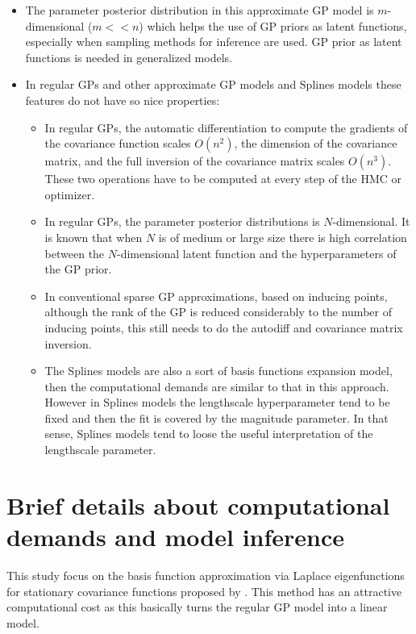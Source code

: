 \documentclass[onecolumn,a4paper,11pt]{article}
\begin{document}
\begin{itemize}
	\item The parameter posterior distribution in this approximate GP model is $m$-dimensional ($m<<n$) which helps the use of GP priors as latent functions, especially when sampling methods for inference are used. GP prior as latent functions is needed in generalized models.

	\item In regular GPs and other approximate GP models and Splines models these features do not have so nice properties:
	\begin{itemize}
		\item In regular GPs, the automatic differentiation to compute the gradients of the covariance function scales $O(n^2)$, the dimension of the covariance matrix, and the full inversion of the covariance matrix scales $O(n^3)$. These two operations have to be computed at every step of the HMC or optimizer.

		\item In regular GPs, the parameter posterior distributions is $N$-dimensional. It is known that when $N$ is of medium or large size there is high correlation between the $N$-dimensional latent function and the hyperparameters of the GP prior.

		\item In conventional sparse GP approximations, based on inducing points, although the rank of the GP is reduced considerably to the number of inducing points, this still needs to do the autodiff and covariance matrix inversion.

		\item The Splines models are also a sort of basis functions expansion model, then the computational demands are similar to that in this approach. However in Splines models the lengthscale hyperparameter tend to be fixed and then the fit is covered by the magnitude parameter. In that sense, Splines models tend to loose the useful interpretation of the lengthscale parameter.
	\end{itemize}
\end{itemize}


\section{Brief details about computational demands and model inference}

This study focus on the basis function approximation via Laplace eigenfunctions for stationary covariance functions proposed by \citet{solin2018hilbert}. This method has an attractive computational cost as this basically turns the regular GP model into a linear model.
\end{document}
